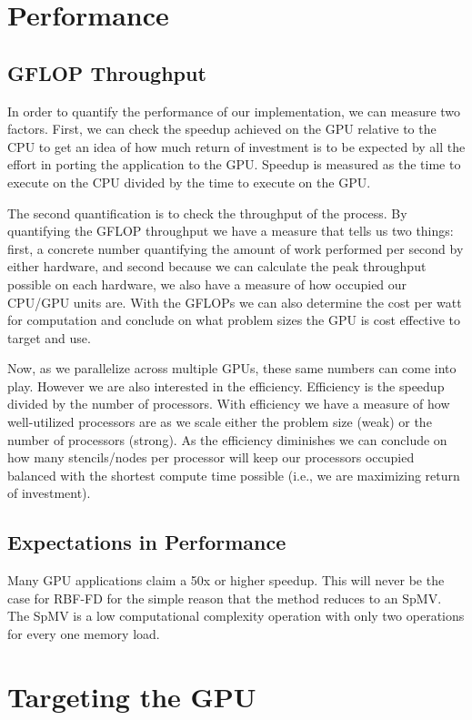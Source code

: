 \documentclass{report}
\begin{document}
\section{Performance}
\subsection{GFLOP Throughput}
In order to quantify the performance of our implementation, we can measure two
factors. First, we can check the speedup achieved on the GPU relative to the
CPU to get an idea of how much return of investment is to be expected by all
the effort in porting the application to the GPU. Speedup is measured as the
time to execute on the CPU divided by the time to execute on the GPU. 

The second quantification is to check the throughput of the process. By
quantifying the GFLOP throughput we have a measure that tells us two things:
first, a concrete number quantifying the amount of work performed per second by
either hardware, and second because we can calculate the peak throughput possible on
each hardware, we also have a measure of how occupied our CPU/GPU units are.
With the GFLOPs we can also determine the cost per watt for computation and
conclude on what problem sizes the GPU is cost effective to target and use. 

Now, as we parallelize across multiple GPUs, these same numbers can come into
play. However we are also interested in the efficiency. Efficiency is the
speedup divided by the number of processors. With efficiency we have a measure
of how well-utilized processors are as we scale either the problem size (weak)
or the number of processors (strong). As the efficiency diminishes we can
conclude on how many stencils/nodes per processor will keep our processors
occupied balanced with the shortest compute time possible (i.e., we are
maximizing return of investment). 

\subsection{Expectations in Performance}
Many GPU applications claim a 50x or higher speedup. This will never be the case for RBF-FD for the simple reason that the method reduces to an SpMV. The SpMV is a low computational complexity operation with only two operations for every one memory load. 


\section{Targeting the GPU}
\end{document}
